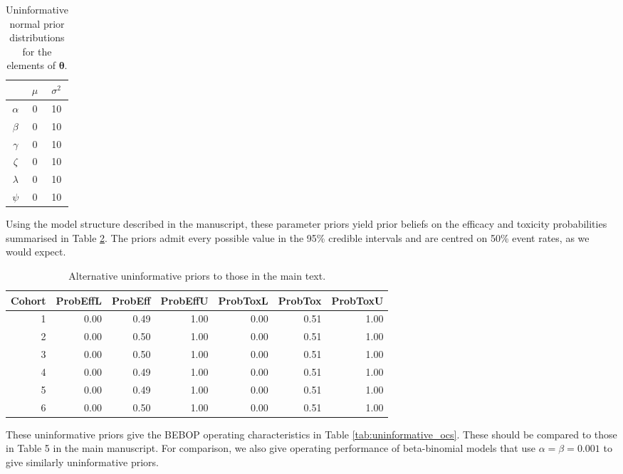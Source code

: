 \documentclass{article}
\begin{document}
\begin{table}[h]
	\centering
	\caption{Uninformative normal prior distributions for the elements of $\boldsymbol{\theta}$.}
	\label{tab:uninf_param_priors}
	\begin{tabular}{ | c | c | c | }
		\hline
		& $\mu$ & $\sigma^2$ \\
		\hline 
		$\alpha$ & 0 & 10 \\ 
		$\beta$ & 0 & 10 \\ 
		$\gamma$ & 0 & 10 \\ 
		$\zeta$ & 0 & 10 \\
		$\lambda$ & 0 & 10 \\ 
		$\psi$ & 0 & 10 \\ 
		\hline 
	\end{tabular} 
\end{table}

Using the model structure described in the manuscript, these parameter priors yield prior beliefs on the efficacy and toxicity probabilities summarised in Table \ref{tab:uninf_priors}. 
The priors admit every possible value in the 95\% credible intervals and are centred on 50\% event rates, as we would expect.

\begin{table}[h]
	\centering
	\begin{tabular}{rrrrrrr}
		Cohort & ProbEffL & ProbEff & ProbEffU & ProbToxL & ProbTox & ProbToxU \\ 
		\hline
		1 & 0.00 & 0.49 & 1.00 & 0.00 & 0.51 & 1.00 \\ 
		2 & 0.00 & 0.50 & 1.00 & 0.00 & 0.51 & 1.00 \\ 
		3 & 0.00 & 0.50 & 1.00 & 0.00 & 0.51 & 1.00 \\ 
		4 & 0.00 & 0.49 & 1.00 & 0.00 & 0.51 & 1.00 \\ 
		5 & 0.00 & 0.49 & 1.00 & 0.00 & 0.51 & 1.00 \\ 
		6 & 0.00 & 0.50 & 1.00 & 0.00 & 0.51 & 1.00 \\ 
	\end{tabular}
	\caption{Alternative uninformative priors to those in the main text.} 
	\label{tab:uninf_priors}
\end{table}

These uninformative priors give the BEBOP operating characteristics in Table \ref{tab:uninformative_ocs}.
These should be compared to those in Table 5 in the main manuscript.
For comparison, we also give operating performance of beta-binomial models that use $\alpha = \beta = 0.001$ to give similarly uninformative priors.
\end{document}
